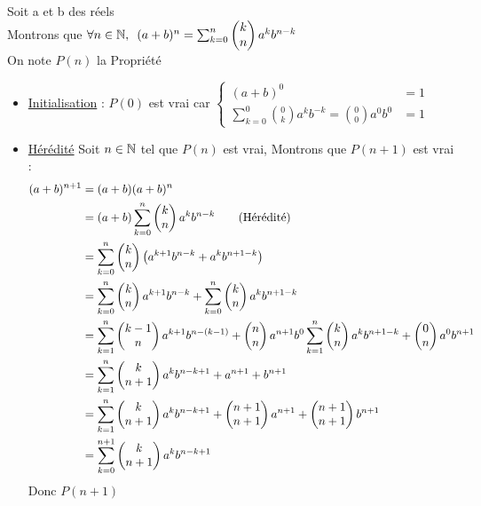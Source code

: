 \begin{dem}
	Soit a et b des réels \\
	Montrons que \(\quantifs{\forall n \in \N} (a+b)^n = \sum_{k=0}^n \binom{n}{k} a^{k}b^{n-k} \) \\
	On note \(P(n)\) la Propriété 
	\begin{itemize}
		\item \underline{Initialisation} :
		      \(P(0)\) est vrai car \(\begin{cases}
			      (a+b)^0                                                         & = 1 \\
			      \sum_{k=0}^0 \binom{0}{k} a^{k}b^{-k} = \binom{0}{0} a^{0}b^{0} & = 1
		      \end{cases}\)
		\item \underline{Hérédité}
		      Soit \(n \in \N\) tel que \(P(n)\) est vrai, Montrons que \(P(n+1)\) est vrai :
              \begin{align*}
                (a+b)^{n+1} &= (a+b)(a+b)^n \\
                &= (a+b) \sum_{k=0}^n \binom{n}{k} a^{k}b^{n-k} \qquad \text{(Hérédité)}\\
                & = \sum_{k=0}^n \binom{n}{k}  \paren{a^{k+1}b^{n-k}+a^{k}b^{n+1-k}} \\
                & =\sum_{k=0}^n \binom{n}{k}  a^{k+1}b^{n-k}+ \sum_{k=0}^n \binom{n}{k}a^{k}b^{n+1-k} \\
                & = \sum_{k=1}^n \binom{n}{k-1}  a^{k+1}b^{n-(k-1)}+\binom{n}{n}a^{n+1}b^0 \sum_{k=1}^n \binom{n}{k}a^{k}b^{n+1-k} + \binom{n}{0}a^0b^{n+1} \\
                & = \sum_{k=1}^n \binom{n+1}{k} a^kb^{n-k+1} + a^{n+1}+ b^{n+1} \\
                & = \sum_{k=1}^n \binom{n+1}{k} a^kb^{n-k+1} + \binom{n+1}{n+1}a^{n+1}+ \binom{n+1}{n+1}b^{n+1} \\
                &= \sum_{k=0}^{n+1} \binom{n+1}{k} a^kb^{n-k+1} 
              \end{align*}
              Donc \(P(n+1)\)
	\end{itemize}
\end{dem}

